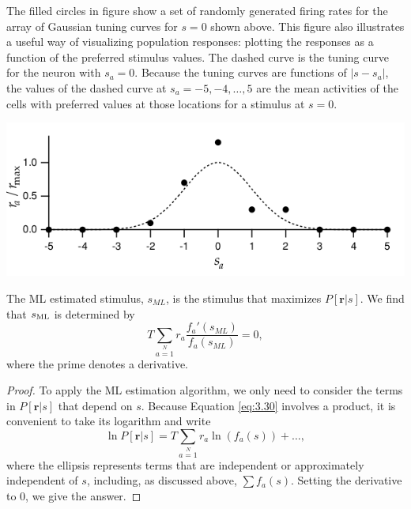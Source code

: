 \begin{exm}
  The filled circles in figure show a set of randomly generated firing rates
for the array of Gaussian tuning curves for $s=0$ shown above. This figure
also illustrates a useful way of visualizing population responses: plotting
the responses as a function of the preferred stimulus values. The dashed
curve is the tuning curve for the neuron with $s_{a}=0$. Because
the tuning curves are functions of $\left| s-s_{a} \right|$, the values of the dashed curve at
$s_{a}=-5,-4,\dots,5$ are the mean activities of the cells with preferred values
at those locations for a stimulus at $s=0$.
\begin{center}
    \label{fig:3-9}
  \includegraphics[scale = 0.4]{./png/3-9}
\end{center}
\end{exm}

\begin{prop}
  The ML estimated stimulus, $s_{ML}$, is the stimulus that maximizes $P[\mathbf{r}|s]$. We
find that $s_{\rm{ML}}$ is determined by
\begin{equation*}
  T\sum\limits_{a=1}\limits^{N}{r_{a}\frac{f_{a}'(s_{ML})}{f_{a}(s_{ML})}}=0,
\end{equation*}
where the prime denotes a derivative.
\begin{proof}
 To apply the ML estimation algorithm, we only need to consider the terms
in $P[\mathbf{r}|s]$ that depend on $s$. Because Equation
\ref{eq:3.30} involves a product, it is convenient to take its logarithm and write
\begin{equation}
  \label{eq:3.31}
  \ln P[\mathbf{r}|s]=T\sum\limits_{a=1}\limits^{N}{r_{a}\ln \left( f_a(s) \right)}+\dots,
\end{equation}
where the ellipsis represents terms that are independent
or approximately independent of $s$, including, as discussed above,
$\sum{f_a(s)}$.
 Setting the derivative to $0$, we give the answer.
 \end{proof}
\end{prop}

